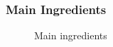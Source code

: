 \begin{frame}
	\frametitle{Main Ingredients}
	\begin{figure}
  	\hspace{-1cm}
	\centering
  	
	\caption{Main ingredients}
	\end{figure}	
\end{frame}